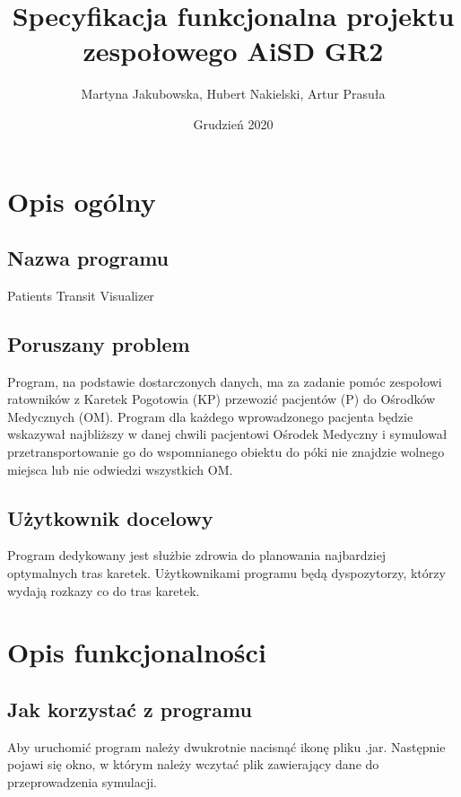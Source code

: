 \documentclass[]{article}
\title{Specyfikacja funkcjonalna projektu zespołowego \textbf{AiSD GR2}}
\author{Martyna Jakubowska, Hubert Nakielski, Artur Prasuła}
\date{Grudzień 2020}
\begin{document}
    \maketitle


    \section{Opis ogólny}

    \subsection{Nazwa programu} %
    Patients Transit Visualizer

    \subsection{Poruszany problem} %
    Program, na podstawie dostarczonych danych, ma za zadanie pomóc zespołowi ratowników z Karetek Pogotowia (KP) przewozić pacjentów (P) do Ośrodków Medycznych (OM). Program dla każdego wprowadzonego pacjenta będzie wskazywał najbliższy w danej chwili pacjentowi Ośrodek Medyczny i symulował przetransportowanie go do wspomnianego obiektu do póki nie znajdzie wolnego miejsca lub nie odwiedzi wszystkich OM.

    \subsection{Użytkownik docelowy}
    Program dedykowany jest służbie zdrowia do planowania najbardziej optymalnych tras karetek.
    Użytkownikami programu będą dyspozytorzy, którzy wydają rozkazy co do tras karetek.


    \section{Opis funkcjonalności}

    \subsection{Jak korzystać z programu} %
    Aby uruchomić program należy dwukrotnie nacisnąć ikonę pliku .jar. Następnie pojawi się okno, w którym należy wczytać plik zawierający dane do przeprowadzenia symulacji.
\end{document}
